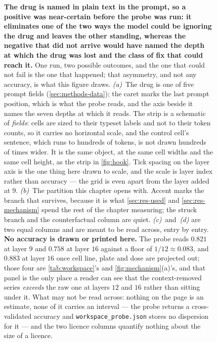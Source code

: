 \begin{figure}[htbp]
\begin{fullwidth}
\centering

\caption[The probe's cheap positive]{\textbf{The drug is named in plain text in
the prompt, so a positive was near-certain before the probe was run: it
eliminates one of the two ways the model could be ignoring the drug and leaves
the other standing, whereas the negative that did not arrive would have named
the depth at which the drug was lost and the class of fix that could reach
it.} One run, two possible outcomes, and the one that could not fail is the one
that happened; that asymmetry, and not any accuracy, is what this figure draws.
\emph{(a)}~The drug is one of five prompt fields (\cref{sec:methods-data}); the
caret marks the last prompt position, which is what the probe reads, and the
axis beside it names the seven depths at which it reads. The strip is a
schematic of \emph{fields}: cells are sized to their typeset labels and not to
their token counts, so it carries no horizontal scale, and the control cell's
sentence, which runs to hundreds of tokens, is not drawn hundreds of times
wider. It is the same object, at the same cell widths and the same cell height,
as the strip in \cref{fig:hook}. Tick spacing on the layer axis is the one
thing here drawn to scale, and the scale is layer index rather than accuracy
--- the grid is even apart from the layer added at $9$. \emph{(b)}~The
partition this chapter opens with. Accent marks the branch that survives,
because it is what \cref{sec:res-used} and \cref{sec:res-mechanism} spend the
rest of the chapter measuring; the struck branch and the counterfactual column
are quiet. \emph{(c)}~and~\emph{(d)} are two equal columns and are meant to be
read across, entry by entry. \textbf{No accuracy is drawn or printed here.} The
probe reads $0.821$ at layer $9$ and $0.758$ at layer $16$ against a floor of
$1/12 \approx 0.083$, and $0.883$ at layer $16$ once cell line, plate and dose
are projected out; those four are \cref{tab:workspace}'s and
\cref{fig:mechanism}(a)'s, and that panel is the only place a reader can see
that the context-removed series \emph{exceeds} the raw one at layers $12$ and
$16$ rather than sitting under it. What may not be read across: nothing on the
page is an estimate, none of it carries an interval --- the probe returns a
cross-validated accuracy and \texttt{workspace\_probe.json} stores no
dispersion for it --- and the two licence columns quantify nothing about the
size of a licence.}
\label{fig:licensing}
\end{fullwidth}
\end{figure}

